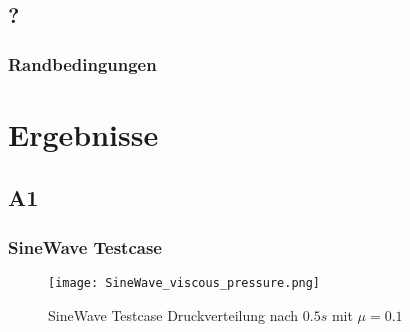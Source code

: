 \documentclass[
	11pt, %
	aspectratio=169, %
]{beamer}
\begin{document}
\subsection{?}
\begin{frame}
	\frametitle{Randbedingungen}

\end{frame}



\section{Ergebnisse}

\subsection{A1}
\begin{frame}
	\frametitle{SineWave Testcase}
	\begin{figure}
		\texttt{[image: SineWave\_viscous\_pressure.png]}
		\caption{SineWave Testcase Druckverteilung nach $0.5s$ mit $\mu = 0.1$}
	\end{figure}
	


\end{frame}
\end{document}

